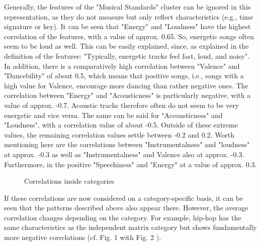 Generally, the features of the "Musical Standards" cluster can be ignored in this representation,
as they do not measure but only reflect characteristics (e.g., time signature or key).
It can be seen that "Energy" and "Loudness" have the highest correlation of the features,
with a value of approx. 0.65.  So, energetic songs often seem to be loud as well.
This can be easily explained, since, as explained in the definition of the features:
"Typically, energetic tracks feel fast, loud, and noisy".
In addition, there is a comparatively high correlation between "Valence" and "Dancebility" of
about 0.5, which means that positive songs, i.e., songs with a high value for Valence,
encourage more dancing than rather negative ones. The correlation between "Energy" and "Acousticness"
is particularly negative, with a value of approx. -0.7.
Acoustic tracks therefore often do not seem to be very energetic and vice versa.
The same can be said for "Accousticness" and "Loudness", with a correlation value of about -0.5.
Outside of these extreme values, the remaining correlation values settle between -0.2 and 0.2.
Worth mentioning here are the correlations between "Instrumentalness" and "loudness" at
approx. -0.3 as well as "Instrumentalness" and Valence also at approx. -0.3. Furthermore,
in the positive "Speechiness" and "Energy" at a value of approx. 0.3.

\begin{figure}[H]
    \centering
    \qquad
    \qquad
    \caption{Correlations inside categories}%
    \label{fig:du_cm_categorie_dependent}%
\end{figure}

If these correlations are now considered on a category-specific basis,
it can be seen that the patterns described above also appear there.
However, the average correlation changes depending on the category.
For example, hip-hop has the same characteristics as the independent matrix category but shows
fundamentally more negative correlations (cf. Fig. 1 with Fig. 2 ).

